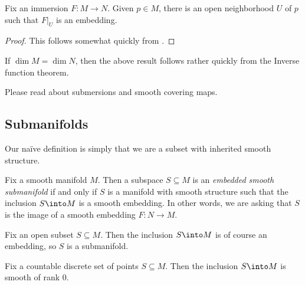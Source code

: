 \documentclass[../notes.tex]{subfiles}
\begin{document}
\begin{proposition}
	Fix an immersion $F\colon M\to N$. Given $p\in M$, there is an open neighborhood $U$ of $p$ such that $F|_U$ is an embedding.
\end{proposition}
\begin{proof}
	This follows somewhat quickly from .
\end{proof}
\begin{remark}
	If $\dim M=\dim N$, then the above result follows rather quickly from the Inverse function theorem.
\end{remark}
\begin{remark}
	Please read about submersions and smooth covering maps.
\end{remark}

\subsection{Submanifolds}
Our na\"ive definition is simply that we are a subset with inherited smooth structure.
\begin{definition}
	Fix a smooth manifold $M$. Then a subspace $S\subseteq M$ is an \textit{embedded smooth submanifold} if and only if $S$ is a manifold with smooth structure such that the inclusion $S\into M$ is a smooth embedding. In other words, we are asking that $S$ is the image of a smooth embedding $F\colon N\to M$.
\end{definition}
\begin{example}
	Fix an open subset $S\subseteq M$. Then the inclusion $S\into M$ is of course an embedding, so $S$ is a submanifold.
\end{example}
\begin{example}
	Fix a countable discrete set of points $S\subseteq M$. Then the inclusion $S\into M$ is smooth of rank $0$.
\end{example}
\end{document}
